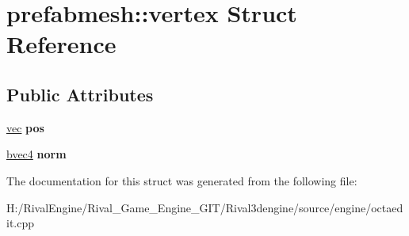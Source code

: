 \hypertarget{structprefabmesh_1_1vertex}{}\section{prefabmesh\+:\+:vertex Struct Reference}
\label{structprefabmesh_1_1vertex}
\subsection*{Public Attributes}
\begin{DoxyCompactItemize}
\item 
\mbox{\label{structprefabmesh_1_1vertex_ab41304ba63f44660d031ca035455e999}} 
\hyperlink{structvec}{vec} {\bfseries pos}
\item 
\mbox{\label{structprefabmesh_1_1vertex_a5ac01131d8c7b5d466419610ffca7ef0}} 
\hyperlink{structbvec4}{bvec4} {\bfseries norm}
\end{DoxyCompactItemize}


The documentation for this struct was generated from the following file\+:\begin{DoxyCompactItemize}
\item 
H\+:/\+Rival\+Engine/\+Rival\+\_\+\+Game\+\_\+\+Engine\+\_\+\+G\+I\+T/\+Rival3dengine/source/engine/octaedit.\+cpp\end{DoxyCompactItemize}
